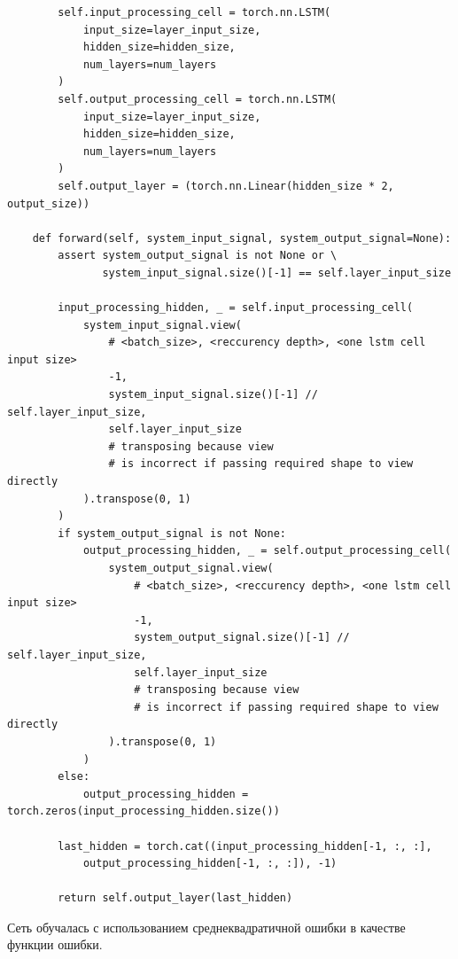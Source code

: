 \documentclass[12pt, oneside]{extbook}
\begin{document}
\begin{flushleft}
\begin{verbatim}
        self.input_processing_cell = torch.nn.LSTM(
            input_size=layer_input_size,
            hidden_size=hidden_size,
            num_layers=num_layers
        )
        self.output_processing_cell = torch.nn.LSTM(
            input_size=layer_input_size,
            hidden_size=hidden_size,
            num_layers=num_layers
        )
        self.output_layer = (torch.nn.Linear(hidden_size * 2, output_size))

    def forward(self, system_input_signal, system_output_signal=None):
        assert system_output_signal is not None or \
               system_input_signal.size()[-1] == self.layer_input_size

        input_processing_hidden, _ = self.input_processing_cell(
            system_input_signal.view(
                # <batch_size>, <reccurency depth>, <one lstm cell input size>
                -1,
                system_input_signal.size()[-1] // self.layer_input_size,
                self.layer_input_size
                # transposing because view 
                # is incorrect if passing required shape to view directly
            ).transpose(0, 1)
        )
        if system_output_signal is not None:
            output_processing_hidden, _ = self.output_processing_cell(
                system_output_signal.view(
                    # <batch_size>, <reccurency depth>, <one lstm cell input size>
                    -1,
                    system_output_signal.size()[-1] // self.layer_input_size,
                    self.layer_input_size
                    # transposing because view 
                    # is incorrect if passing required shape to view directly
                ).transpose(0, 1)
            )
        else:
            output_processing_hidden = torch.zeros(input_processing_hidden.size())

        last_hidden = torch.cat((input_processing_hidden[-1, :, :],
            output_processing_hidden[-1, :, :]), -1)

        return self.output_layer(last_hidden)

\end{verbatim}
\par
Сеть обучалась с использованием среднеквадратичной ошибки в качестве функции ошибки.
\pagebreak

\end{flushleft}
\end{document}
